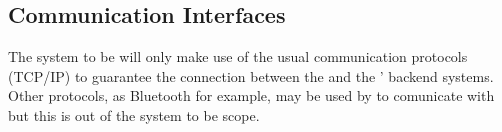 \documentclass[../../../rasd.tex]{subfiles}
\begin{document}
\subsection{Communication Interfaces}
The system to be will only make use of the usual communication protocols (TCP/IP) to guarantee the connection between the  and the ' backend systems.
\\ Other protocols, as Bluetooth for example, may be used by  to comunicate with  but this is out of the system to be scope.
\newpage
\end{document}
